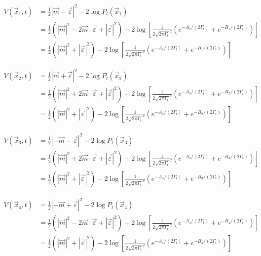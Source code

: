 \documentclass[11pt,a4paper]{article}
\begin{document}
\begin{align}
V(\vec{x}_1, t) &= \frac{1}{2}|\vec{m} - \vec{\varepsilon}|^2 - 2\log P_t(\vec{x}_1) \\
&= \frac{1}{2}(|\vec{m}|^2 - 2\vec{m}\cdot\vec{\varepsilon} + |\vec{\varepsilon}|^2) - 2\log\left[\frac{1}{2\sqrt{2\pi\Gamma_t}^d}\left(e^{-A_1/(2\Gamma_t)} + e^{-B_1/(2\Gamma_t)}\right)\right] \\
&= \frac{1}{2}(|\vec{m}|^2 + |\vec{\varepsilon}|^2) - 2\log\left[\frac{1}{2\sqrt{2\pi\Gamma_t}^d}\left(e^{-A_1/(2\Gamma_t)} + e^{-B_1/(2\Gamma_t)}\right)\right]
\end{align}

\begin{align}
V(\vec{x}_2, t) &= \frac{1}{2}|\vec{m} + \vec{\varepsilon}|^2 - 2\log P_t(\vec{x}_2) \\
&= \frac{1}{2}(|\vec{m}|^2 + 2\vec{m}\cdot\vec{\varepsilon} + |\vec{\varepsilon}|^2) - 2\log\left[\frac{1}{2\sqrt{2\pi\Gamma_t}^d}\left(e^{-A_2/(2\Gamma_t)} + e^{-B_2/(2\Gamma_t)}\right)\right] \\
&= \frac{1}{2}(|\vec{m}|^2 + |\vec{\varepsilon}|^2) - 2\log\left[\frac{1}{2\sqrt{2\pi\Gamma_t}^d}\left(e^{-A_2/(2\Gamma_t)} + e^{-B_2/(2\Gamma_t)}\right)\right]
\end{align}

\begin{align}
V(\vec{x}_3, t) &= \frac{1}{2}|-\vec{m} - \vec{\varepsilon}|^2 - 2\log P_t(\vec{x}_3) \\
&= \frac{1}{2}(|\vec{m}|^2 + 2\vec{m}\cdot\vec{\varepsilon} + |\vec{\varepsilon}|^2) - 2\log\left[\frac{1}{2\sqrt{2\pi\Gamma_t}^d}\left(e^{-A_3/(2\Gamma_t)} + e^{-B_3/(2\Gamma_t)}\right)\right] \\
&= \frac{1}{2}(|\vec{m}|^2 + |\vec{\varepsilon}|^2) - 2\log\left[\frac{1}{2\sqrt{2\pi\Gamma_t}^d}\left(e^{-A_3/(2\Gamma_t)} + e^{-B_3/(2\Gamma_t)}\right)\right]
\end{align}

\begin{align}
V(\vec{x}_4, t) &= \frac{1}{2}|-\vec{m} + \vec{\varepsilon}|^2 - 2\log P_t(\vec{x}_4) \\
&= \frac{1}{2}(|\vec{m}|^2 - 2\vec{m}\cdot\vec{\varepsilon} + |\vec{\varepsilon}|^2) - 2\log\left[\frac{1}{2\sqrt{2\pi\Gamma_t}^d}\left(e^{-A_4/(2\Gamma_t)} + e^{-B_4/(2\Gamma_t)}\right)\right] \\
&= \frac{1}{2}(|\vec{m}|^2 + |\vec{\varepsilon}|^2) - 2\log\left[\frac{1}{2\sqrt{2\pi\Gamma_t}^d}\left(e^{-A_4/(2\Gamma_t)} + e^{-B_4/(2\Gamma_t)}\right)\right]
\end{align}
\end{document}
